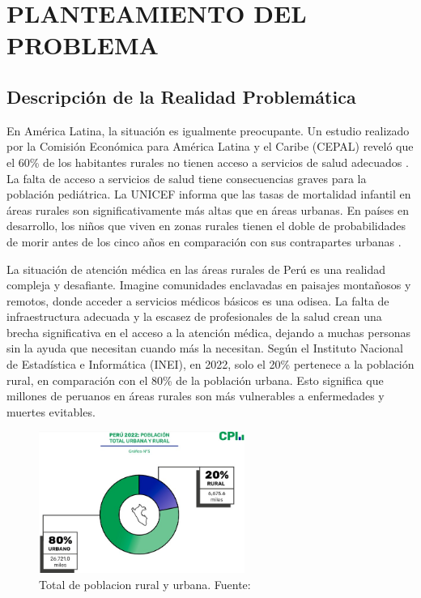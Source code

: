 \chapter{PLANTEAMIENTO DEL PROBLEMA}
\section{Descripción de la Realidad Problemática}

En América Latina, la situación es igualmente preocupante. Un estudio realizado por la Comisión Económica para América Latina y el Caribe (CEPAL) reveló que el 60\% de los habitantes rurales no tienen acceso a servicios de salud adecuados \citep*{OECD_World_Bank_2020}. La falta de acceso a servicios de salud tiene consecuencias graves para la población pediátrica. La UNICEF informa que las tasas de mortalidad infantil en áreas rurales son significativamente más altas que en áreas urbanas. En países en desarrollo, los niños que viven en zonas rurales tienen el doble de probabilidades de morir antes de los cinco años en comparación con sus contrapartes urbanas \cite{Unicef}.

La situación de atención médica en las áreas rurales de Perú es una realidad compleja y desafiante. Imagine comunidades enclavadas en paisajes montañosos y remotos, donde acceder a servicios médicos básicos es una odisea. La falta de infraestructura adecuada y la escasez de profesionales de la salud crean una brecha significativa en el acceso a la atención médica, dejando a muchas personas sin la ayuda que necesitan cuando más la necesitan. Según el Instituto Nacional de Estadística e Informática (INEI), en 2022, solo el 20\% pertenece a la población rural, en comparación con el 80\% de la población urbana. Esto significa que millones de peruanos en áreas rurales son más vulnerables a enfermedades y muertes evitables.

\begin{figure}[h]
	\begin{center}
		\includegraphics[width=0.6\textwidth]{1/figures/INEITOTAL.jpeg}
		\caption{Total de poblacion rural y urbana. Fuente: \cite{gl_inei}}
		\label{1:fig}
	\end{center}
\end{figure}

